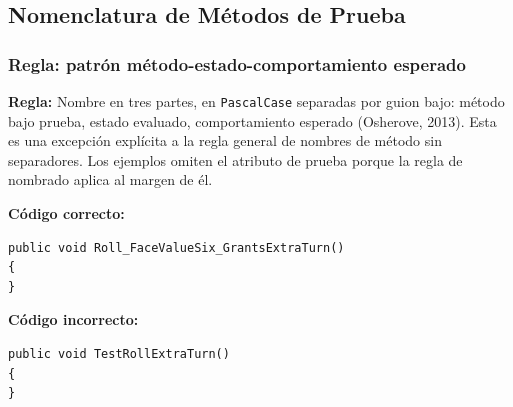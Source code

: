 \subsection{Nomenclatura de Métodos de Prueba}

\subsubsection{Regla: patrón método-estado-comportamiento esperado}

\textbf{Regla:} Nombre en tres partes, en \texttt{PascalCase} separadas por guion bajo: método bajo prueba, estado evaluado, comportamiento esperado (Osherove, 2013). Esta es una excepción explícita a la regla general de nombres de método sin separadores. Los ejemplos omiten el atributo de prueba porque la regla de nombrado aplica al margen de él.

\textbf{Código correcto:}
\begin{lstlisting}[style=csharpstyle]
public void Roll_FaceValueSix_GrantsExtraTurn()
{
}
\end{lstlisting}

\textbf{Código incorrecto:}
\begin{lstlisting}[style=csharpstyle]
public void TestRollExtraTurn()
{
}
\end{lstlisting}
